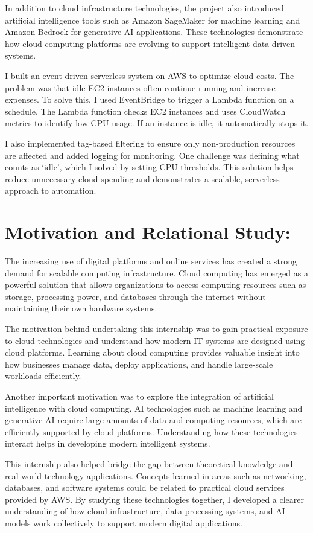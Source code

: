 \documentclass[12pt, a4paper, oneside]{report}
\begin{document}
In addition to cloud infrastructure technologies, the project also introduced artificial 
intelligence tools such as Amazon SageMaker for machine learning and Amazon 
Bedrock for generative AI applications. These technologies demonstrate how cloud 
computing platforms are evolving to support intelligent data-driven systems.

I built an event-driven serverless system on AWS to optimize cloud costs. 
The problem was that idle EC2 instances often continue running and increase expenses. 
To solve this, I used EventBridge to trigger a Lambda function on a schedule. The 
Lambda function checks EC2 instances and uses CloudWatch metrics to identify low 
CPU usage. If an instance is idle, it automatically stops it.

I also implemented tag-based filtering to ensure only non-production resources are 
affected and added logging for monitoring. One challenge was defining what counts as 
`idle', which I solved by setting CPU thresholds. This solution helps reduce unnecessary 
cloud spending and demonstrates a scalable, serverless approach to automation.
\newpage
\section{Motivation and Relational Study:}

The increasing use of digital platforms and online services has created a strong demand 
for scalable computing infrastructure. Cloud computing has emerged as a powerful 
solution that allows organizations to access computing resources such as storage, 
processing power, and databases through the internet without maintaining their own 
hardware systems.

The motivation behind undertaking this internship was to gain practical exposure to 
cloud technologies and understand how modern IT systems are designed using cloud 
platforms. Learning about cloud computing provides valuable insight into how 
businesses manage data, deploy applications, and handle large-scale workloads 
efficiently.

Another important motivation was to explore the integration of artificial intelligence 
with cloud computing. AI technologies such as machine learning and generative AI 
require large amounts of data and computing resources, which are efficiently supported 
by cloud platforms. Understanding how these technologies interact helps in developing 
modern intelligent systems.

This internship also helped bridge the gap between theoretical knowledge and real-world 
technology applications. Concepts learned in areas such as networking, databases, and 
software systems could be related to practical cloud services provided by AWS. By 
studying these technologies together, I developed a clearer understanding of how cloud 
infrastructure, data processing systems, and AI models work collectively to support 
modern digital applications.
\newpage
\end{document}

